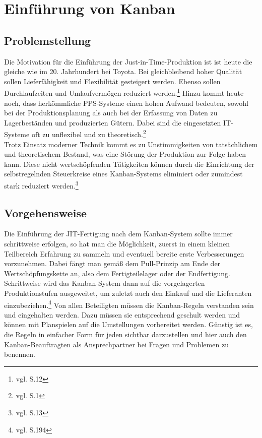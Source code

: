 \section{Einführung von Kanban}
\subsection{Problemstellung}
Die Motivation für die Einführung der Just-in-Time-Produktion ist ist heute die gleiche wie im 20. Jahrhundert bei Toyota.
Bei gleichbleibend hoher Qualität sollen Lieferfähigkeit und Flexibilität gesteigert werden.
Ebenso sollen Durchlaufzeiten und Umlaufvermögen reduziert werden.\footnote{vgl. \cite{Geiger2011Kanban} S.12}
Hinzu kommt heute noch, dass herkömmliche PPS-Systeme einen hohen Aufwand bedeuten, 
sowohl bei der Produktionsplanung als auch bei der Erfassung von Daten zu Lagerbeständen und produzierten Gütern.
Dabei sind die eingesetzten IT-Systeme oft zu unflexibel und zu theoretisch.\footnote{vgl. \cite{Weber2014KE} S.1}\\
Trotz Einsatz moderner Technik kommt es zu Unstimmigkeiten von tatsächlichem und theoretischem Bestand, 
was eine Störung der Produktion zur Folge haben kann.
Diese nicht wertschöpfenden Tätigkeiten können durch die Einrichtung der selbstregelnden 
Steuerkreise eines Kanban-Systems eliminiert oder zumindest stark reduziert werden.\footnote{vgl. \cite{Geiger2011Kanban} S.13}\\

\subsection{Vorgehensweise}
Die Einführung der JIT-Fertigung nach dem Kanban-System sollte immer schrittweise erfolgen,
so hat man die Möglichkeit, zuerst in einem kleinen Teilbereich Erfahrung zu 
sammeln und eventuell bereite erste Verbesserungen vorzunehmen. 
Dabei fängt man gemäß dem Pull-Prinzip am Ende der Wertschöpfungskette an, 
also dem Fertigteilelager oder der Endfertigung. Schrittweise wird das Kanban-System 
dann auf die vorgelagerten Produktionstufen ausgeweitet, um zuletzt auch den Einkauf und die Lieferanten einzubeziehen.\footnote{vgl. \cite{Takeda2012SPS} S.194}
Von allen Beteiligten müssen die Kanban-Regeln verstanden sein und eingehalten werden. 
Dazu müssen sie entsprechend geschult werden und können mit Planspielen auf die Umstellungen vorbereitet werden.
Günstig ist es, die Regeln in einfacher Form für jeden sichtbar darzustellen und hier auch den 
Kanban-Beauftragten als Ansprechpartner bei Fragen und Problemen zu benennen.

